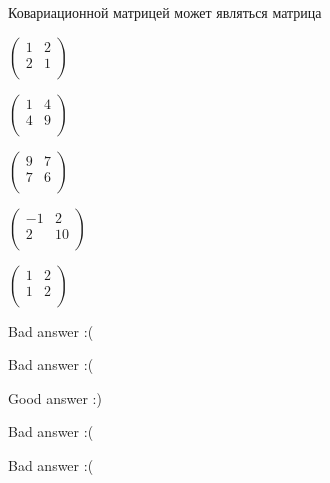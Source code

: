 
\begin{question}
Ковариационной матрицей может являться матрица
\begin{answerlist}
  \item \(\begin{pmatrix} 1 & 2 \\ 2 & 1 \\ \end{pmatrix}\)
  \item \(\begin{pmatrix} 1 & 4 \\ 4 & 9 \\ \end{pmatrix}\)
  \item \(\begin{pmatrix} 9 & 7 \\ 7 & 6 \\ \end{pmatrix}\)
  \item \(\begin{pmatrix} -1 & 2 \\ 2 & 10 \\ \end{pmatrix}\)
  \item \(\begin{pmatrix} 1 & 2 \\ 1 & 2 \\ \end{pmatrix}\)
\end{answerlist}
\end{question}

\begin{solution}
\begin{answerlist}
  \item Bad answer :(
  \item Bad answer :(
  \item Good answer :)
  \item Bad answer :(
  \item Bad answer :(
\end{answerlist}
\end{solution}

